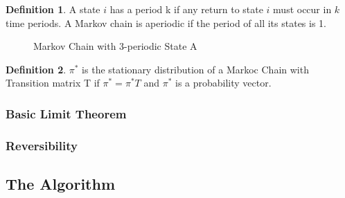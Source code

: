 \documentclass[12pt,english,a4paper,oneside]{article}
\theoremstyle{definition}
\newtheorem{definition}{Definition}[section]
\theoremstyle{definition}
\theoremstyle{definition}
\theoremstyle{definition}
\theoremstyle{remark}
\begin{document}
\begin{definition}
A state $i$ has a period k if any return to state $i$ must occur in $k$ time periods. A Markov chain is aperiodic if the period of all its states is 1.
\end{definition}

\begin{figure}[H]
\label{fig:ex3}
\centering

  
  \caption{Markov Chain with 3-periodic State A}

\end{figure}

\begin{definition}
$\pi^*$ is the stationary distribution of a Markoc Chain with Transition matrix T if $\pi^* = \pi^* T$ and $\pi^*$ is a probability vector.
\end{definition}

\hypertarget{basic-limit-theorem}{%
\subsubsection{Basic Limit Theorem}\label{basic-limit-theorem}}

\hypertarget{reversibility}{%
\subsubsection{Reversibility}\label{reversibility}}

\hypertarget{the-algorithm}{%
\subsection{The Algorithm}\label{the-algorithm}}
\end{document}
